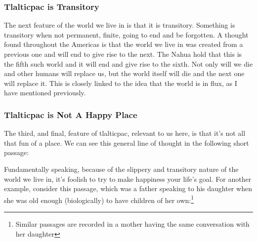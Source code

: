 \subsubsection{Tlalticpac is Transitory}

The next feature of the world we live in is that it is transitory. Something is transitory when not permanent, finite, going to end and be forgotten. A thought found throughout the Americas is that the world we live in was created from a previous one and will end to give rise to the next. The Nahua hold that this is the fifth such world and it will end and give rise to the sixth. Not only will we die and other humans will replace us, but the world itself will die and the next one will replace it. This is closely linked to the idea that the world is in flux, as I have mentioned previously.


\subsubsection{Tlalticpac is Not A Happy Place}

The third, and final, feature of tlalticpac, relevant to us here, is that it's not all that fun of a place. We can see this general line of thought in the following short passage:

Fundamentally speaking, because of the slippery and transitory nature of the world we live in, it's foolish to try to make happiness your life's goal. For another example, consider this passage, which was a father speaking to his daughter when she was old enough (biologically) to have children of her own:\footnote{Similar passages are recorded in a mother having the same conversation with her daughter}


